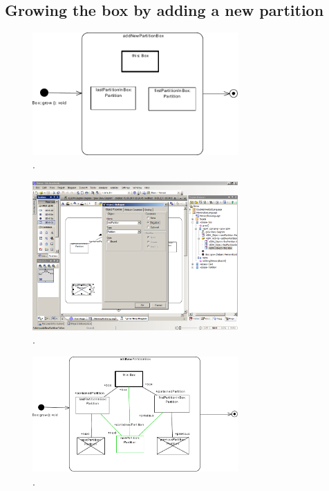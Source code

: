 \subsection{Growing the box by adding a new partition}
\begin{figure}[htp]
\begin{center}
  \includegraphics[width=0.7\textwidth]{pics/sdmBilder/grow/sdm57}
  \caption{.}  
  \label{fig:sdm_grow_}
\end{center}
\end{figure}

\begin{figure}[htp]
\begin{center}
  \includegraphics[width=0.7\textwidth]{pics/sdmBilder/grow/sdm58RAW}
  \caption{.}  
  \label{fig:sdm_grow_}
\end{center}
\end{figure}

\begin{figure}[htp]
\begin{center}
  \includegraphics[width=0.7\textwidth]{pics/sdmBilder/grow/sdm65}
  \caption{.}  
  \label{fig:sdm_grow_}
\end{center}
\end{figure}

